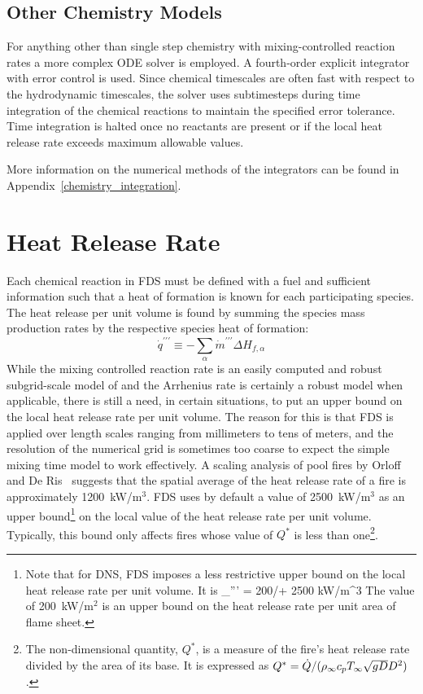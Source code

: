 \subsection{Other Chemistry Models}

For anything other than single step chemistry with mixing-controlled reaction rates a more complex ODE solver is employed.  A fourth-order explicit integrator with error control is used.  Since chemical timescales are often fast with respect to the hydrodynamic timescales, the solver uses subtimesteps during time integration of the chemical reactions to maintain the specified error tolerance.  Time integration is halted once no reactants are present or if the local heat release rate exceeds maximum allowable values.

More information on the numerical methods of the integrators can be found in Appendix~\ref{chemistry_integration}.


\section{Heat Release Rate}

Each chemical reaction in FDS must be defined with a fuel and sufficient information such that a heat of formation is known for each participating species. The heat release per unit volume is found by summing the species mass production rates by the respective species heat of formation:
\begin{equation}\label{eq:vol_heat_gen}
\dot{q}^{\prime\prime\prime} \equiv -\displaystyle \sum_{\alpha} \dot{m}^{\prime\prime\prime} \Delta H_{f,\alpha}
\end{equation}
While the mixing controlled reaction rate is an easily computed and robust subgrid-scale model of and the Arrhenius rate is certainly a robust model when applicable, there is still a need, in certain situations, to put an upper bound on the local heat release rate per unit volume. The reason for
this is that FDS is applied over length scales ranging from millimeters to tens of meters, and the resolution of the numerical grid
is sometimes too coarse to expect the simple mixing time model to work effectively.
A scaling analysis of pool fires by Orloff and De Ris~\cite{Orloff:19th_Symposium} suggests that the spatial average of the
heat release rate of a fire is approximately 1200~kW/m$^3$. FDS uses by default a value of 2500~kW/m$^3$ as an upper bound\footnote{Note that
for DNS, FDS imposes a less restrictive upper bound on the local heat release rate per unit volume. It is
\be \dq_{\max}''' = 200/\dx + 2500 \quad \hbox{kW/m}^3 \ee
The value of 200~kW/m$^2$ is an upper bound on the heat release rate per unit area of flame sheet.}
on the local value of the heat release rate per unit volume. Typically, this bound only affects fires whose value of $Q^*$
is less than one\footnote{The non-dimensional quantity, $Q^*$, is a measure of the fire's heat release rate divided by the
area of its base. It is expressed as $Q^*=\dot{Q}/(\rho_\infty c_p T_\infty \sqrt{g D} D^2)$.}.

